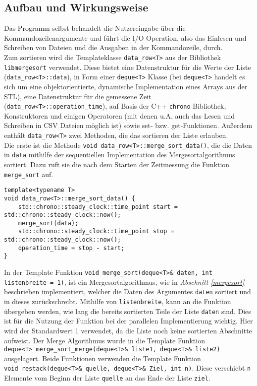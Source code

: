 \subsection{Aufbau und Wirkungsweise}
Das Programm selbst behandelt die Nutzereingabe über die Kommandozeilenargumente und führt die \ac{I/O} Operation, also das Einlesen und Schreiben von Dateien und die Ausgaben in der Kommandozeile, durch.\\
Zum sortieren wird die Templateklasse \texttt{data\_row<T>} aus der Bibliothek\\ \texttt{libmergesort} verwendet. Diese bietet eine Datenstruktur für die Werte der Liste (\texttt{data\_row<T>::data}), in Form einer \texttt{deque<T>} Klasse (bei \texttt{deque<T>} handelt es sich um eine objektorientierte, dynamische Implementation eines Arrays aus der \ac{STL}), eine Datenstruktur für die gemessene Zeit (\texttt{data\_row<T>::operation\_time}), auf Basis der C++ \texttt{chrono} Bibliothek, Konstruktoren und einigen Operatoren (mit denen u.A. auch das Lesen und Schreiben in \ac{CSV} Dateien möglich ist) sowie set- bzw. get-Funktionen. Außerdem enthält \texttt{data\_row<T>} zwei Methoden, die das sortieren der Liste erlauben.\\
Die erste ist die Methode \texttt{void data\_row<T>::merge\_sort\_data()}, die die Daten in \texttt{data} mithilfe der sequentiellen Implementation des Mergesortalgorithmus sortiert. Dazu ruft sie die nach dem Starten der Zeitmessung die Funktion \texttt{merge\_sort} auf.
\begin{lstlisting}
template<typename T>
void data_row<T>::merge_sort_data() {
	std::chrono::steady_clock::time_point start = std::chrono::steady_clock::now();
	merge_sort(data);
	std::chrono::steady_clock::time_point stop = std::chrono::steady_clock::now();
	operation_time = stop - start;
}
\end{lstlisting}
In der Template Funktion \texttt{void merge\_sort(deque<T>\& daten, int listenbreite = 1)}, ist ein Mergesortalgorithmus, wie in \textit{Abschnitt \ref{mergesort}} beschrieben implementiert, welcher die Daten des Argumentes \texttt{daten} sortiert und in dieses zurückschreibt. Mithilfe von \texttt{listenbreite}, kann an die Funktion übergeben werden, wie lang die bereits sortierten Teile der Liste \texttt{daten} sind. Dies ist für die Nutzung der Funktion bei der parallelen Implementierung wichtig. Hier wird der Standardwert 1 verwendet, da die Liste noch keine sortierten Abschnitte aufweist. Der Merge Algorithmus wurde in die Template Funktion\\ \texttt{deque<T> merge\_sort\_merge(deque<T>\& liste1, deque<T>\& liste2)} ausgelagert. Beide Funktionen verwenden die Template Funktion\\ \texttt{void restack(deque<T>\& quelle, deque<T>\& Ziel, int n)}. Diese verschiebt \texttt{n} Elemente vom Beginn der Liste \texttt{quelle} an das Ende der Liste \texttt{ziel}.
